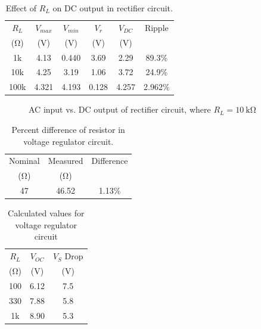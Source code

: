 \documentclass{article}
\begin{document}
\begin{table}[hbtp]
  \centering
  \begin{tabular}{cccccc}
    $R_L$ & $V_{max}$ & $V_{min}$ & $V_r$ & $V_{DC}$ & Ripple \\
    (\si{\ohm}) & (\si{V}) & (\si{V}) & (\si{V}) & (\si{V}) & \\
    \hline
    1k & 4.13 & 0.440 & 3.69 & 2.29 & 89.3\% \\
    10k & 4.25 & 3.19 & 1.06 & 3.72 & 24.9\% \\
    100k & 4.321 & 4.193 & 0.128 & 4.257 & 2.962\% \\
  \end{tabular}
  \caption{\label{tab:load_v_ripple} Effect of $R_L$ on DC output in rectifier circuit.}
\end{table}

\begin{figure}[hbtp]
  \centering
  
  \caption{\label{fig:rect_vp_vdc} AC input vs. DC output of rectifier circuit, where $R_L=\SI{10}{\kilo\ohm}$}
\end{figure}

\begin{table}[hbtp]
  \centering
  \begin{tabular}{ccc}
    Nominal & Measured & Difference \\
    (\si{\ohm}) & (\si{\ohm}) & \\
    \hline
    47 & 46.52 & 1.13\% \\
  \end{tabular}
  \caption{\label{tab:res} Percent difference of resistor in voltage regulator circuit.}
\end{table}

\begin{table}
  \centering
  \begin{tabular}{ccc}
    $R_L$ & $V_{OC}$ & $V_S$ Drop \\
    (\si{\ohm})  & (\si{V}) & (\si{V}) \\
    \hline
    100 & 6.12 & 7.5 \\
    330 & 7.88 & 5.8 \\
    1k & 8.90 & 5.3 \\
  \end{tabular}
  \caption{\label{tab:volt_reg_calc} Calculated values for voltage regulator circuit}
\end{table}
\end{document}
